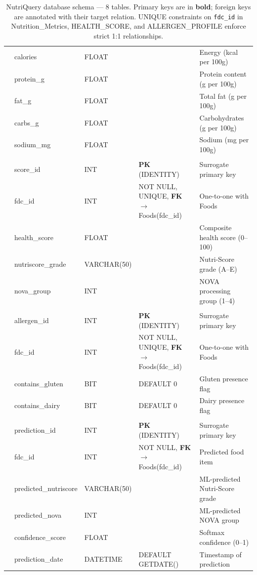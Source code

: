 \documentclass[12pt,a4paper]{article}
\begin{document}
\begin{table}[H]
{\begin{tabular}{llllp{4.5cm}}
& calories     & FLOAT &                       & Energy (kcal per 100g) \\
& protein\_g   & FLOAT &                       & Protein content (g per 100g) \\
& fat\_g       & FLOAT &                       & Total fat (g per 100g) \\
& carbs\_g     & FLOAT &                       & Carbohydrates (g per 100g) \\
& sodium\_mg   & FLOAT &                       & Sodium (mg per 100g) \\
\midrule
\rowcolor{gray!10}
\multicolumn{5}{l}{\textbf{HEALTH\_SCORE}} \\
& score\_id        & INT         & \textbf{PK} (IDENTITY) & Surrogate primary key \\
& fdc\_id          & INT         & NOT NULL, UNIQUE, \textbf{FK} $\to$ Foods(fdc\_id) & One-to-one with Foods \\
& health\_score    & FLOAT       &                        & Composite health score (0--100) \\
& nutriscore\_grade & VARCHAR(50) &                       & Nutri-Score grade (A--E) \\
& nova\_group      & INT         &                        & NOVA processing group (1--4) \\
\midrule
\rowcolor{gray!10}
\multicolumn{5}{l}{\textbf{ALLERGEN\_PROFILE}} \\
& allergen\_id    & INT  & \textbf{PK} (IDENTITY)  & Surrogate primary key \\
& fdc\_id         & INT  & NOT NULL, UNIQUE, \textbf{FK} $\to$ Foods(fdc\_id) & One-to-one with Foods \\
& contains\_gluten & BIT & DEFAULT 0               & Gluten presence flag \\
& contains\_dairy  & BIT & DEFAULT 0               & Dairy presence flag \\
\midrule
\rowcolor{gray!10}
\multicolumn{5}{l}{\textbf{ML\_Predictions}} \\
& prediction\_id       & INT       & \textbf{PK} (IDENTITY) & Surrogate primary key \\
& fdc\_id              & INT       & NOT NULL, \textbf{FK} $\to$ Foods(fdc\_id) & Predicted food item \\
& predicted\_nutriscore & VARCHAR(50) &                     & ML-predicted Nutri-Score grade \\
& predicted\_nova      & INT       &                        & ML-predicted NOVA group \\
& confidence\_score    & FLOAT     &                        & Softmax confidence (0--1) \\
& prediction\_date     & DATETIME  & DEFAULT GETDATE()      & Timestamp of prediction \\
\bottomrule
\end{tabular}%
}
\caption{NutriQuery database schema --- 8 tables. Primary keys are in \textbf{bold}; foreign keys are annotated with their target relation. UNIQUE constraints on \texttt{fdc\_id} in Nutrition\_Metrics, HEALTH\_SCORE, and ALLERGEN\_PROFILE enforce strict 1:1 relationships.}
\label{tab:schema}
\end{table}
\end{document}
